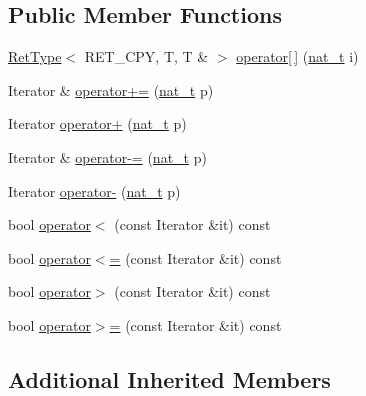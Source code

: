 \subsection*{Public Member Functions}
\begin{DoxyCompactItemize}
\item 
\hyperlink{namespace_designar_ab937f9c4bf5f1d0e65dbc616245d50ee}{Ret\+Type}$<$ R\+E\+T\+\_\+\+C\+PY, T, T \& $>$ \hyperlink{class_designar_1_1_random_access_iterator_a19e24a37b546cb41aed275ff61fbc0b7}{operator\mbox{[}$\,$\mbox{]}} (\hyperlink{namespace_designar_aa72662848b9f4815e7bf31a7cf3e33d1}{nat\+\_\+t} i)
\item 
Iterator \& \hyperlink{class_designar_1_1_random_access_iterator_aad12a146046f6463476453b3aac61359}{operator+=} (\hyperlink{namespace_designar_aa72662848b9f4815e7bf31a7cf3e33d1}{nat\+\_\+t} p)
\item 
Iterator \hyperlink{class_designar_1_1_random_access_iterator_af5b2b9cab5cf3ac48cbc712c24f02c97}{operator+} (\hyperlink{namespace_designar_aa72662848b9f4815e7bf31a7cf3e33d1}{nat\+\_\+t} p)
\item 
Iterator \& \hyperlink{class_designar_1_1_random_access_iterator_ac7ede306e0004e8c178059ede8e239ba}{operator-\/=} (\hyperlink{namespace_designar_aa72662848b9f4815e7bf31a7cf3e33d1}{nat\+\_\+t} p)
\item 
Iterator \hyperlink{class_designar_1_1_random_access_iterator_ab59d5341ccba07c66bf2f6a904d5a6c1}{operator-\/} (\hyperlink{namespace_designar_aa72662848b9f4815e7bf31a7cf3e33d1}{nat\+\_\+t} p)
\item 
bool \hyperlink{class_designar_1_1_random_access_iterator_ad37f72e55f884ad8f41d4426f2e34d01}{operator$<$} (const Iterator \&it) const
\item 
bool \hyperlink{class_designar_1_1_random_access_iterator_a1e3696df89803b90124dae7b648bd875}{operator$<$=} (const Iterator \&it) const
\item 
bool \hyperlink{class_designar_1_1_random_access_iterator_a4d72737c88579cc302bc91d3520150fa}{operator$>$} (const Iterator \&it) const
\item 
bool \hyperlink{class_designar_1_1_random_access_iterator_a38642462d4d39e78533715d41e949a6a}{operator$>$=} (const Iterator \&it) const
\end{DoxyCompactItemize}
\subsection*{Additional Inherited Members}


